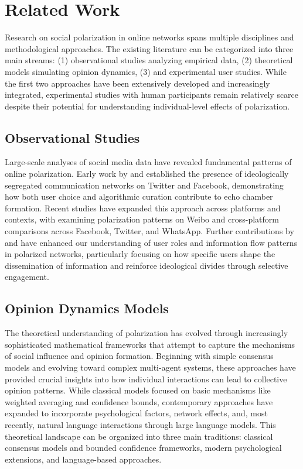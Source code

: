 \section{Related Work}

Research on social polarization in online networks spans multiple disciplines and methodological approaches. The existing literature can be categorized into three main streams: (1) observational studies analyzing empirical data, (2) theoretical models simulating opinion dynamics, (3) and experimental user studies. While the first two approaches have been extensively developed and increasingly integrated, experimental studies with human participants remain relatively scarce despite their potential for understanding individual-level effects of polarization.

\subsection{Observational Studies}
Large-scale analyses of social media data have revealed fundamental patterns of online polarization. Early work by \citep{conover_political_2011} and \citep{bakshy_exposure_2015} established the presence of ideologically segregated communication networks on Twitter and Facebook, demonstrating how both user choice and algorithmic curation contribute to echo chamber formation. Recent studies have expanded this approach across platforms and contexts, with \citep{xing_research_2022} examining polarization patterns on Weibo and \citep{yarchi_political_2021} cross-platform comparisons across Facebook, Twitter, and WhatsApp. Further contributions by \citep{jiang_political_2020} and \citep{recuero_using_2019} have enhanced our understanding of user roles and information flow patterns in polarized networks, particularly focusing on how specific users shape the dissemination of information and reinforce ideological divides through selective engagement.

\subsection{Opinion Dynamics Models}
The theoretical understanding of polarization has evolved through increasingly sophisticated mathematical frameworks that attempt to capture the mechanisms of social influence and opinion formation. Beginning with simple consensus models and evolving toward complex multi-agent systems, these approaches have provided crucial insights into how individual interactions can lead to collective opinion patterns. While classical models focused on basic mechanisms like weighted averaging and confidence bounds, contemporary approaches have expanded to incorporate psychological factors, network effects, and, most recently, natural language interactions through large language models. This theoretical landscape can be organized into three main traditions: classical consensus models and bounded confidence frameworks, modern psychological extensions, and language-based approaches.

